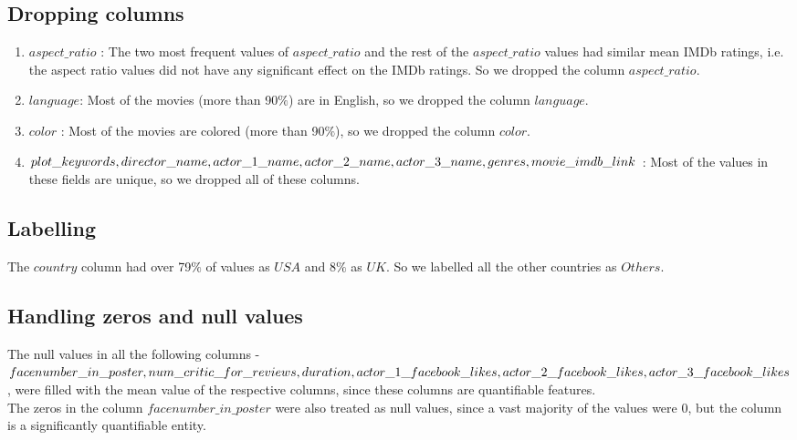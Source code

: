 \documentclass[conference]{IEEEtran}
\begin{document}
\subsection{Dropping columns}
    \begin{enumerate}
        \item $aspect\_ratio$ : The two most frequent values of $aspect\_ratio            $ and the rest of the $aspect\_ratio$ values had similar mean IMDb                 ratings, i.e. the aspect ratio values did not have any significant effect on the IMDb ratings. So we dropped the column $aspect\_ratio$.\\
        
        \item $language$: Most of the movies (more than 90$\%$) are in                 English, so we dropped the column $language$.\\
        
        \item $color$ : Most of the movies are colored (more than 90$\%$), so             we dropped the column $color$.\\
        
        \item $plot\_keywords, director\_name, actor\_1\_name, \\ actor                    \_2\_name,            actor\_3\_name, genres,\\ movie\_imdb\_link$ :                 Most             of the values in                 these fields are                 unique, so we dropped         all of these columns.\\
    \end{enumerate}
\subsection{Labelling}
The $country$ column had over 79$\%$ of values as $USA$ and 8$\%$ as $UK$. So we labelled all the other countries as $Others$.\\
\subsection{Handling zeros and null values}
The null values in all the following columns - $facenumber\_in\_poster, num\_critic\_for\_reviews, duration, \\ actor\_1\_facebook\_likes, actor\_2\_facebook\_likes, \\actor\_3\_facebook\_likes$, were filled with the mean value of the respective columns, since these columns are quantifiable features. \\
The zeros in the column $facenumber\_in\_poster$ were also treated as null values, since a vast majority of the values were 0, but the column is a significantly quantifiable entity. \\
\end{document}
